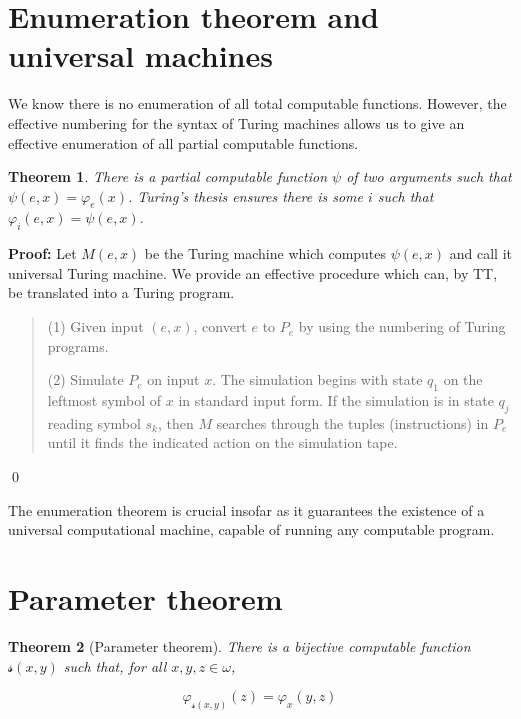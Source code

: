 \documentclass[a4paper, 12pt]{article}
\newtheorem{theorem}{Theorem}
\newtheorem{theorem}{Theorem}
\newenvironment{proof}[1][Proof]{\par\small\noindent\textbf{#1:} }{\qed\par\normalsize}
\begin{document}
\section{Enumeration theorem and universal machines}

We know there is no enumeration of all total computable functions. However, 
the effective numbering for the syntax of Turing machines allows us to give an 
effective enumeration of all partial computable functions.

\begin{theorem}
    There is a partial computable function $\psi$ of two arguments such that 
    $\psi(e, x) = \varphi_e(x)$. Turing's thesis ensures there is 
    some $i$ such that $\varphi_i(e, x) = \psi(e, x)$.
\end{theorem}

\begin{proof}
    Let $M(e, x)$ be the Turing machine which computes $\psi(e, x)$ and 
    call it universal Turing machine. We provide an effective procedure which can, 
    by TT, be translated into a Turing program.

    
    \small
    \begin{quote}
    
        (1) Given input $(e, x)$, convert $e$ to $P_e$ by using the numbering of 
        Turing programs. 

        (2) Simulate $P_e$ on input $x$. The simulation begins with state 
        $q_1$ on the leftmost symbol of $x$ in standard input form. 
        If the simulation is in state $q_j$ reading symbol $s_k$, then 
        $M$ searches through the tuples (instructions) in $P_e$ until it finds 
        the indicated action on the simulation tape.
    
    \end{quote}
    \normalsize
    
\end{proof}

The enumeration theorem is crucial insofar as it guarantees the existence of a 
universal computational machine, capable of running any computable program.

\section{Parameter theorem}

\begin{theorem}[Parameter theorem]
    There is a bijective computable function $\mathcal{s}(x, y)$ such that,
    for all $x, y, z \in \omega$,

    \begin{equation*}
    \varphi_{\mathcal{s}(x, y)}(z) = \varphi_x(y, z)
    \end{equation*}
\end{theorem}
\end{document}
